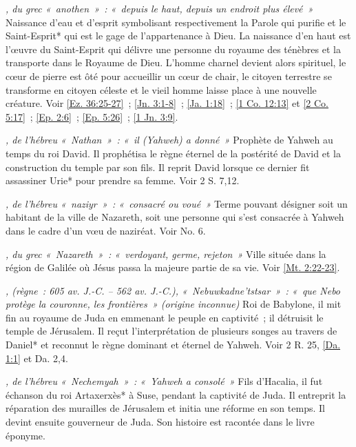 \begin{multicols}{2}
\textit{, du grec «~anothen~»~: «~depuis le haut, depuis un endroit plus élevé~»}\newline
Naissance d'eau et d'esprit symbolisant respectivement la Parole qui purifie et le Saint-Esprit* qui est le gage de l'appartenance à Dieu. La naissance d'en haut est l'œuvre du Saint-Esprit qui délivre une personne du royaume des ténèbres et la transporte dans le Royaume de Dieu. L'homme charnel devient alors spirituel, le cœur de pierre est ôté pour accueillir un cœur de chair, le citoyen terrestre se transforme en citoyen céleste et le vieil homme laisse place à une nouvelle créature. Voir \vref{Ez. 36:25-27}~; \vref{Jn. 3:1-8}~; \vref{Ja. 1:18}~; \vref{1 Co. 12:13} et \vref{2 Co. 5:17}~; \vref{Ep. 2:6}~; \vref{Ep. 5:26}~; \vref{1 Jn. 3:9}.

\textit{, de l'hébreu «~Nathan~»~: «~il (Yahweh) a donné~»}\newline
Prophète de Yahweh au temps du roi David. Il prophétisa le règne éternel de la postérité de David et la construction du temple par son fils. Il reprit David lorsque ce dernier fit assassiner Urie* pour prendre sa femme. Voir 2 S. 7,12.

\textit{, de l'hébreu «~naziyr~»~: «~consacré ou voué~»}\newline
Terme pouvant désigner soit un habitant de la ville de Nazareth, soit une personne qui s'est consacrée à Yahweh dans le cadre d'un vœu de naziréat. Voir No. 6.

\textit{, du grec «~Nazareth~»~: «~verdoyant, germe, rejeton~»}\newline
Ville située dans la région de Galilée où Jésus passa la majeure partie de sa vie. Voir \vref{Mt. 2:22-23}.

\textit{, (règne~: 605 av. J.-C. – 562 av. J.-C.), «~Nebuwkadne'tstsar~»~: «~que Nebo protège la couronne, les frontières~» (origine inconnue)}\newline
Roi de Babylone, il mit fin au royaume de Juda en emmenant le peuple en captivité~; il détruisit le temple de Jérusalem. Il reçut l'interprétation de plusieurs songes au travers de Daniel* et reconnut le règne dominant et éternel de Yahweh. Voir 2 R. 25, \vref{Da. 1:1} et Da. 2,4.

\textit{, de l'hébreu «~Nechemyah~»~: «~Yahweh a consolé~»}\newline
Fils d'Hacalia, il fut échanson du roi Artaxerxès* à Suse, pendant la captivité de Juda. Il entreprit la réparation des murailles de Jérusalem et initia une réforme en son temps. Il devint ensuite gouverneur de Juda. Son histoire est racontée dans le livre éponyme.


\end{multicols}
